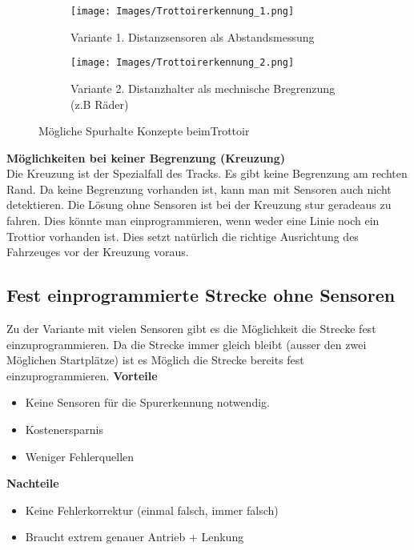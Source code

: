 \begin{figure} [hbp]
	\centering
	\begin{subfigure}[b]{0.4\textwidth}
		\texttt{[image: Images/Trottoirerkennung\_1.png]}
		\caption{Variante 1. Distanzsensoren als Abstandsmessung}
	\end{subfigure}
	\hfill
	\begin{subfigure}[b]{0.4\textwidth}
		\texttt{[image: Images/Trottoirerkennung\_2.png]}
		\caption{Variante 2. Distanzhalter als mechnische Bregrenzung (z.B Räder)}
\end{subfigure}
	\caption{Mögliche Spurhalte Konzepte beimTrottoir}\label{fig:animals}
\end{figure}

\textbf {Möglichkeiten bei keiner Begrenzung (Kreuzung)} \\
Die Kreuzung ist der Spezialfall des Tracks. Es gibt keine Begrenzung am rechten Rand. 
Da keine Begrenzung vorhanden ist, kann man mit Sensoren auch nicht detektieren.
Die Lösung ohne Sensoren ist bei der Kreuzung stur geradeaus zu fahren. Dies könnte man einprogrammieren, wenn weder eine Linie noch ein Trottior vorhanden ist. Dies setzt natürlich die richtige Ausrichtung des Fahrzeuges vor der Kreuzung voraus.

\subsection{Fest einprogrammierte Strecke ohne Sensoren}
Zu der Variante mit vielen Sensoren gibt es die Möglichkeit die Strecke fest einzuprogrammieren. Da die Strecke immer gleich bleibt (ausser den zwei Möglichen Startplätze) ist es Möglich die Strecke bereits fest einzuprogrammieren.
\textbf {Vorteile}
\begin{itemize}
\item Keine Sensoren für die Spurerkennung notwendig.
\item Kostenersparnis
\item Weniger Fehlerquellen\\
\end{itemize}
\textbf {Nachteile}
\begin{itemize}
\item Keine Fehlerkorrektur (einmal falsch, immer falsch)
\item Braucht extrem genauer Antrieb + Lenkung
\end{itemize}